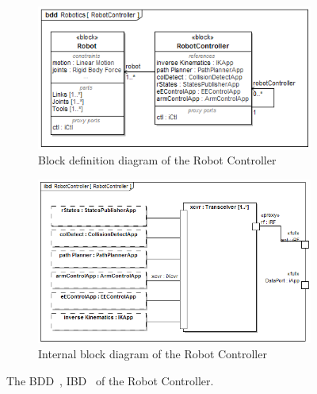 \begin{figure}[ht]
	
	\centering
	
	\begin{subfigure}{.5\textwidth}
		\centering
		\includegraphics[width=.8\linewidth]{./chapter-sysml/diagrams/bdd__Robotics__RobotController}  
		\caption{Block definition diagram of the Robot Controller}
		\label{sysml:fig:robotcontroller:bdd}
	\end{subfigure}

	\begin{subfigure}{.5\textwidth}
		\centering
		\includegraphics[width=.8\linewidth]{./chapter-sysml/diagrams/ibd__RobotController__RobotController}  
		\caption{Internal block diagram of the Robot Controller}
		\label{sysml:fig:robotcontroller:ibd}
	\end{subfigure}

	\caption{The BDD~\protect{}, IBD~\protect{} of the Robot Controller.}
	\label{sysml:fig:robotcontroller:full}
	
\end{figure}

